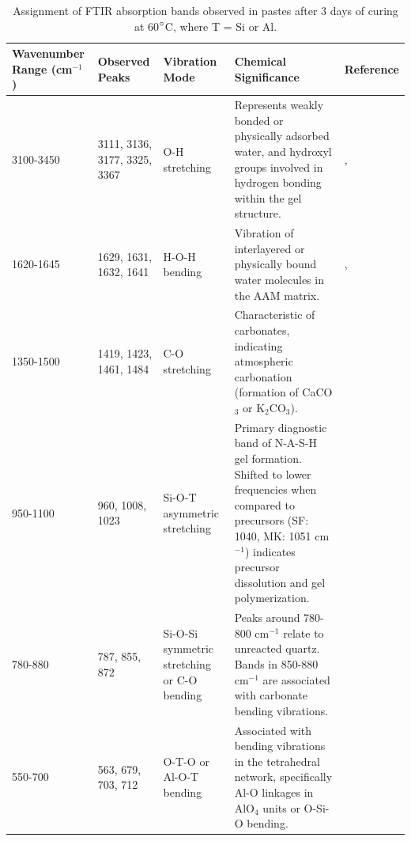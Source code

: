 \begin{landscape}
    \begin{table}[p]
    \centering
    \caption{Assignment of FTIR absorption bands observed in pastes after 3 days of curing at 60$^{\circ}$C, where T = Si or Al.}
    \vspace{0.5cm}
    {\small %
    \renewcommand{\arraystretch}{1.2} %
    \begin{tabular}{p{2.5cm} p{2.5cm} p{3cm} p{8cm} p{3cm}}
        \hline
        Wavenumber Range (cm$^{-1}$) & Observed Peaks & Vibration Mode & Chemical Significance & Reference \\
        \hline
        3100-3450 & 3111, 3136, 3177, 3325, 3367 & O-H stretching & Represents weakly bonded or physically adsorbed water, and hydroxyl groups involved in hydrogen bonding within the gel structure. & \cite{Zhao2023}, \cite{provis2009geopolymers, ma2022calcium}\\
        1620-1645 & 1629, 1631, 1632, 1641 & H-O-H bending & Vibration of interlayered or physically bound water molecules in the AAM matrix. & \cite{Zhao2023}, \cite{pachecotorgal2014handbook}\\
        1350-1500 & 1419, 1423, 1461, 1484 & C-O stretching & Characteristic of carbonates, indicating atmospheric carbonation (formation of CaCO$_3$ or K$_2$CO$_3$). & \cite{Zhao2023, pachecotorgal2014handbook, moraes2024scsa}\\
        950-1100 & 960, 1008, 1023 & Si-O-T asymmetric stretching & Primary diagnostic band of N-A-S-H gel formation. Shifted to lower frequencies when compared to precursors (SF: 1040, MK: 1051 cm$^{-1}$) indicates precursor dissolution and gel polymerization. & \cite{ma2022calcium, Zhao2023, provis2009geopolymers}\\
        780-880 & 787, 855, 872 & Si-O-Si symmetric stretching or C-O bending & Peaks around 780-800 cm$^{-1}$ relate to unreacted quartz. Bands in 850-880 cm$^{-1}$ are associated with carbonate bending vibrations. & \cite{moraes2024scsa, pachecotorgal2014handbook}\\
        550-700 & 563, 679, 703, 712 & O-T-O or Al-O-T bending & Associated with bending vibrations in the tetrahedral network, specifically Al-O linkages in AlO$_4$ units or O-Si-O bending. & \cite{Zhao2023, ma2022calcium} \\
        \hline
    \end{tabular}
    }
    \label{tab:ftir_assignments}
    \end{table}
\end{landscape}

